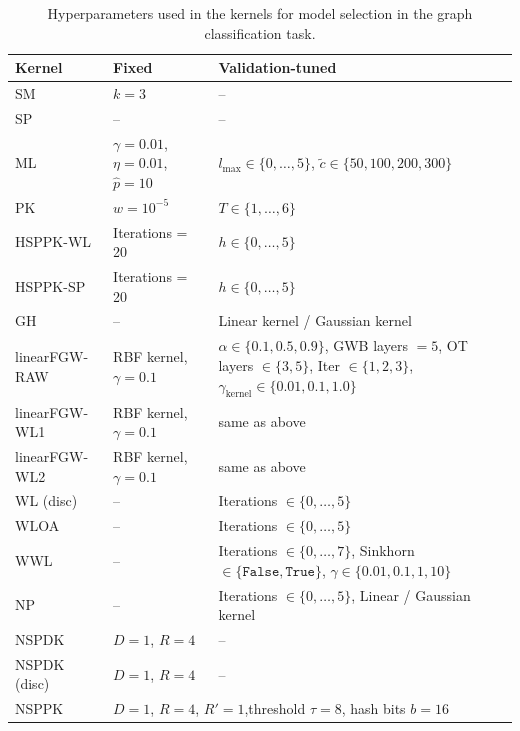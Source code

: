\begin{table}[H]
    \centering
    \footnotesize  %
    \renewcommand{\arraystretch}{1.2}
    \caption{Hyperparameters used in the kernels for model selection in the graph classification task.}
    \label{tab:hyperparameters}
    \begin{tabular}{l p{3.5cm} p{8.5cm}}
        \toprule
        \textbf{Kernel} & \textbf{Fixed} & \textbf{Validation-tuned} \\
        \midrule
        SM & $k = 3$ & -- \\
        SP & -- & -- \\
        ML & $\gamma = 0.01$, $\eta = 0.01$, $\hat{p} = 10$ & $l_{\max} \in \{0,\dots,5\}$, $\tilde{c} \in \{50,100,200,300\}$ \\
        PK & $w = 10^{-5}$ & $T \in \{1,\dots,6\}$ \\
        HSPPK-WL & Iterations = 20  & $h \in \{0,\dots,5\}$ \\
        HSPPK-SP & Iterations = 20  & $h \in \{0,\dots,5\}$ \\
        GH & -- & Linear kernel / Gaussian kernel \\
        linearFGW-RAW & RBF kernel, $\gamma = 0.1$ & $\alpha \in \{0.1, 0.5, 0.9\}$, GWB layers $= 5$, OT layers $\in \{3,5\}$, Iter $\in \{1,2,3\}$, $\gamma_{\text{kernel}} \in \{0.01, 0.1, 1.0\}$ \\
        linearFGW-WL1 & RBF kernel, $\gamma = 0.1$ & same as above \\
        linearFGW-WL2 & RBF kernel, $\gamma = 0.1$ & same as above \\
        WL (disc) & -- & Iterations $\in \{0,\dots,5\}$ \\
        WLOA & -- & Iterations $\in \{0,\dots,5\}$ \\
        WWL & -- & Iterations $\in \{0,\dots,7\}$, Sinkhorn $\in \{\texttt{False}, \texttt{True}\}$, $\gamma \in \{0.01, 0.1, 1, 10\}$ \\
        NP & -- & Iterations $\in \{0,\dots,5\}$, Linear / Gaussian kernel \\
        NSPDK & $D = 1$, $R = 4$ & -- \\
        NSPDK (disc) & $D = 1$, $R = 4$ & -- \\
        NSPPK & \multicolumn{2}{p{12cm}}{\centering $D = 1$, $R = 4$, $R' = 1$,threshold $\tau = 8$, hash bits $b = 16$} \\
        \bottomrule
    \end{tabular}
\end{table}


